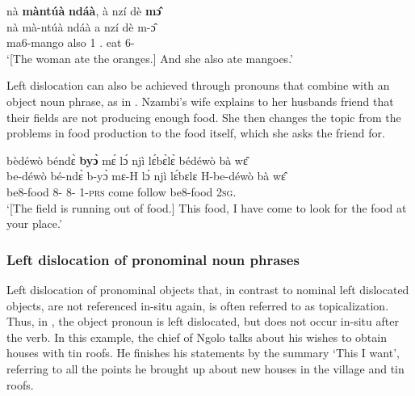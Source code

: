 \ea \label{left4} 
   \glll  nà {\bfseries màntúà} {\bfseries ndáà}, à nzí dè {\bfseries mɔ̂}\\
       nà mà-ntúà ndáà a nzí dè m-ɔ̂\\
       {\COM} ma6-mango also 1 {\PROG}.{\PST} eat 6-{\OBJ}\\
    \trans `[The woman ate the oranges.] And she also ate mangoes.'
\z





Left dislocation can also be achieved through pronouns that combine with an object noun phrase, 
as in . Nzambi's wife explains to her husbands friend that their fields are not producing enough food. She then changes the topic from the problems in food production to the food itself, which she asks the friend for.

\ea \label{Emp4} 
  \glll bèdéwò béndɛ̀ {\bfseries byɔ̀} mɛ́ lɔ́ njì lɛ́bɛ̀lɛ̀ bédéwò bà wɛ̂\\
        be-déwò bé-ndɛ̀ b-yɔ̀ mɛ-H lɔ́ njì lɛ́bɛlɛ H-be-déwò bà wɛ̂\\
           be8-food 8-{\ANA} 8-{\OBJ} 1-\textsc{prs} {\RETRO} come  follow be8-food {\AP} 2\textsc{sg}.{\OBJ}\\
    \trans `[The field is running out of food.] This food, I have come to look for the food at your place.'
\z






\subsubsection{Left dislocation of pronominal noun phrases}
\label{sec:topical}

Left dislocation of pronominal objects that, in contrast to nominal left dislocated objects, are not referenced in-situ again, is often referred to as topicalization.
Thus, in , the object pronoun is left dislocated, but does not occur in-situ after the verb. In this example, the chief of Ngolo talks about his wishes to obtain houses with tin roofs.  He finishes his statements by the summary `This I want', referring to all the points he brought up about new houses in the village and tin roofs.

